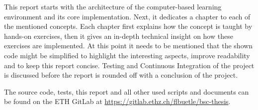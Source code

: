 This report starts with the architecture of the computer-based learning environment and its core implementation. Next, it dedicates a chapter to each of the mentioned concepts. Each chapter first explains how the concept is taught by hands-on exercises, then it gives an in-depth technical insight on how these exercises are implemented. At this point it needs to be mentioned that the shown code might be simplified to highlight the interesting aspects, improve readability and to keep this report concise. Testing and Continuous Integration of the project is discussed before the report is rounded off with a conclusion of the project.

The source code, tests, this report and all other used scripts and documents can be found on the ETH GitLab at \url{https://gitlab.ethz.ch/flbuetle/bsc-thesis}.